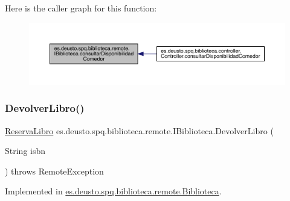 Here is the caller graph for this function\+:
\nopagebreak
\begin{figure}[H]
\begin{center}
\leavevmode
\includegraphics[width=350pt]{interfacees_1_1deusto_1_1spq_1_1biblioteca_1_1remote_1_1_i_biblioteca_ab6188ebc7f0b5e23bdfc9e4a86395373_icgraph}
\end{center}
\end{figure}
\mbox{\label{interfacees_1_1deusto_1_1spq_1_1biblioteca_1_1remote_1_1_i_biblioteca_aace05bd0eeb7af574d9725203672f5c8}} 
\subsubsection{\texorpdfstring{Devolver\+Libro()}{DevolverLibro()}}
{\footnotesize\ttfamily \mbox{\hyperlink{classes_1_1deusto_1_1spq_1_1biblioteca_1_1data_1_1_reserva_libro}{Reserva\+Libro}} es.\+deusto.\+spq.\+biblioteca.\+remote.\+I\+Biblioteca.\+Devolver\+Libro (\begin{DoxyParamCaption}\item[{String}]{isbn }\end{DoxyParamCaption}) throws Remote\+Exception}



Implemented in \mbox{\hyperlink{classes_1_1deusto_1_1spq_1_1biblioteca_1_1remote_1_1_biblioteca_a739d23f2912d2f102eadf6e90c12ab61}{es.\+deusto.\+spq.\+biblioteca.\+remote.\+Biblioteca}}.

